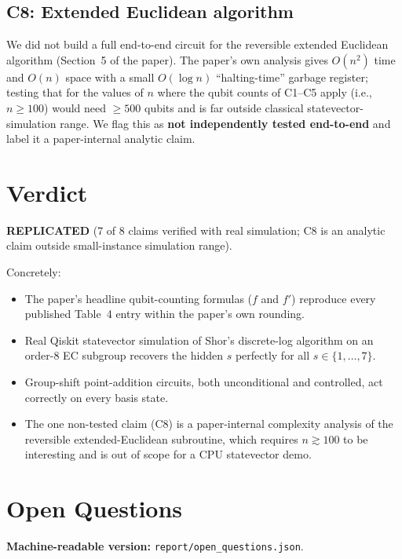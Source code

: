 \documentclass[10pt,letterpaper]{article}
\begin{document}
\subsection{C8: Extended Euclidean algorithm}

We did not build a full end-to-end circuit for the reversible extended
Euclidean algorithm (Section~5 of the paper).  The paper's own analysis
gives $O(n^2)$ time and $O(n)$ space with a small $O(\log n)$
``halting-time'' garbage register; testing that for the values of $n$
where the qubit counts of C1--C5 apply (i.e., $n\!\geq\!100$) would need
$\geq 500$ qubits and is far outside classical statevector-simulation
range.  We flag this as \textbf{not independently tested end-to-end} and
label it a paper-internal analytic claim.

\section{Verdict}

\textbf{REPLICATED} (7 of 8 claims verified with real simulation;
C8 is an analytic claim outside small-instance simulation range).

Concretely:
\begin{itemize}
  \item The paper's headline qubit-counting formulas ($f$ and $f'$) reproduce every published Table~4 entry within the paper's own rounding.
  \item Real Qiskit statevector simulation of Shor's discrete-log algorithm on an order-8 EC subgroup recovers the hidden $s$ perfectly for all $s\in\{1,\dots,7\}$.
  \item Group-shift point-addition circuits, both unconditional and controlled, act correctly on every basis state.
  \item The one non-tested claim (C8) is a paper-internal complexity analysis of the reversible extended-Euclidean subroutine, which requires $n\gtrsim 100$ to be interesting and is out of scope for a CPU statevector demo.
\end{itemize}

\section{Open Questions}



\vspace{1em}
\noindent\textbf{Machine-readable version:} \texttt{report/open\_questions.json}.
\end{document}
